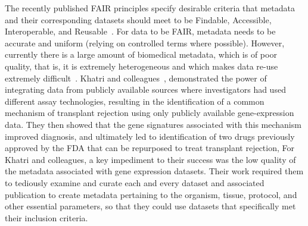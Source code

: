 The recently published FAIR principles specify desirable criteria that metadata and their corresponding datasets should meet to be Findable, Accessible, Interoperable, and Reusable~\cite{Wilkinson2016}.
For data to be FAIR, metadata needs to be accurate and uniform (relying on controlled terms where possible). However, currently there is a large amount of biomedical metadata, which is of poor quality, that is, it is extremely heterogeneous and which makes data re-use extremely difficult~\cite{gonccalves2017metadata}. 
Khatri and colleagues~\cite{khatri2013common}, demonstrated the power of integrating data from publicly available sources where investigators had used different assay technologies, resulting in the identification of a common mechanism of transplant rejection using only publicly available gene-expression data. They then showed that the gene signatures associated with this mechanism improved diagnosis, and ultimately led to identification of two drugs previously approved by the FDA that can be repurposed to treat transplant rejection,
For Khatri and colleagues, a key impediment to their success was the low quality of the metadata associated with gene expression datasets. Their work required them to tediously examine and curate each and every dataset and associated publication to create metadata pertaining to the organism, tissue, protocol, and other essential parameters, so that they could use datasets that specifically met their inclusion criteria.

